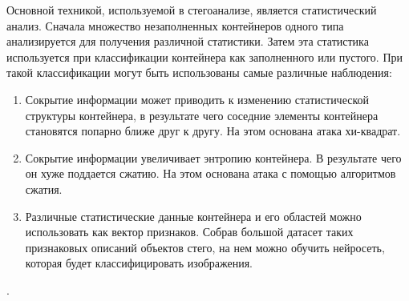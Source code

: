 Основной техникой, используемой в стегоанализе, является статистический анализ.
Сначала множество незаполненных контейнеров одного типа анализируется для получения
различной статистики. Затем эта статистика используется при классификации контейнера
как заполненного или пустого. При такой классификации могут быть использованы
самые различные наблюдения:
\begin{enumerate}
    \item Сокрытие информации может приводить к изменению статистической структуры
    контейнера, в результате чего соседние элементы контейнера становятся попарно ближе
    друг к другу. На этом основана атака хи-квадрат.
    \item Сокрытие информации увеличивает энтропию контейнера. В результате чего он
    хуже поддается сжатию. На этом основана атака с помощью алгоритмов сжатия.
    \item Различные статистические данные контейнера и его областей можно использовать
    как вектор признаков. Собрав большой датасет таких признаковых описаний объектов стего,
    на нем можно обучить нейросеть, которая будет классифицировать изображения.
\end{enumerate}.